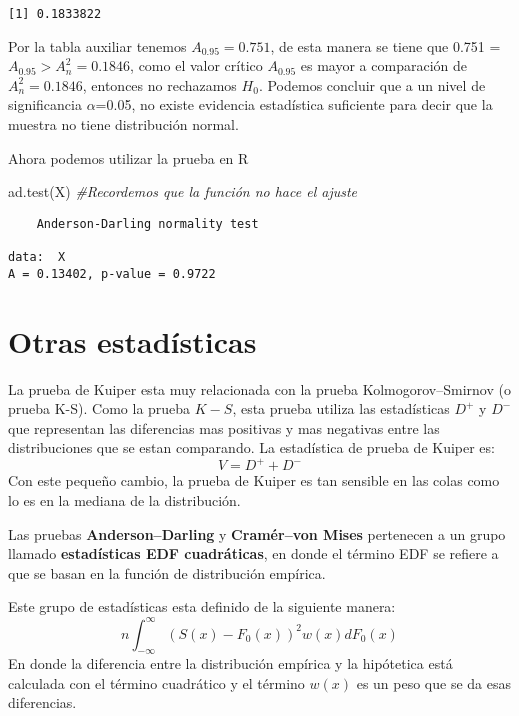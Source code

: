 \documentclass[
  a4paper,
  oneside,
  openany]{book}
\newenvironment{Shaded}{\begin{snugshade}}{\end{snugshade}}
\newcommand{\CommentTok}[1]{\textcolor[rgb]{0.56,0.35,0.01}{\textit{#1}}}
\newcommand{\FunctionTok}[1]{\textcolor[rgb]{0.00,0.00,0.00}{#1}}
\newcommand{\NormalTok}[1]{#1}
\begin{document}
\begin{verbatim}
[1] 0.1833822
\end{verbatim}

Por la tabla auxiliar tenemos \(A_{0.95}=0.751\), de esta manera se tiene que 0.751 = \(A_{0.95} > A_{n}^2=0.1846\), como el valor crítico \(A_{0.95}\) es mayor a comparación de \(A_{n}^2=0.1846\), entonces no rechazamos \(H_0\). Podemos concluir que a un nivel de significancia \(\alpha\)=0.05, no existe evidencia estadística suficiente para decir que la muestra no tiene distribución normal.

Ahora podemos utilizar la prueba en R

\begin{Shaded}
\begin{Highlighting}[]
\FunctionTok{ad.test}\NormalTok{(X)   }\CommentTok{\#Recordemos que la función no hace el ajuste}
\end{Highlighting}
\end{Shaded}

\begin{verbatim}
    Anderson-Darling normality test

data:  X
A = 0.13402, p-value = 0.9722
\end{verbatim}

\hypertarget{otras-estaduxedsticas}{%
\chapter{Otras estadísticas}\label{otras-estaduxedsticas}}

La prueba de Kuiper esta muy relacionada con la prueba Kolmogorov--Smirnov (o prueba K-S). Como la prueba \(K-S\), esta prueba utiliza las estadísticas \(D^+\) y \(D^-\) que representan las diferencias mas positivas y mas negativas entre las distribuciones que se estan comparando. La estadística de prueba de Kuiper es:
\[V=D^+ + D^-\]
Con este pequeño cambio, la prueba de Kuiper es tan sensible en las colas como lo es en la mediana de la distribución.

Las pruebas \textbf{Anderson--Darling} y \textbf{Cramér--von Mises} pertenecen a un grupo llamado \textbf{estadísticas EDF cuadráticas}, en donde el término EDF se refiere a que se basan en la función de distribución empírica.

Este grupo de estadísticas esta definido de la siguiente manera:
\[n\int_{-\infty}^{\infty}(S(x)-F_0(x))^2w(x)dF_0(x)\]
En donde la diferencia entre la distribución empírica y la hipótetica está calculada con el término cuadrático y el término \(w(x)\) es un peso que se da esas diferencias.
\end{document}
